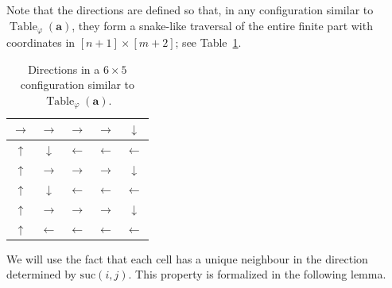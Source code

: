 \documentclass{article}
\theoremstyle{plain}
\theoremstyle{definition}
\DeclareMathOperator{\Table}{Table}
\newcommand{\tuple}{\mathbf}
\begin{document}
Note that the directions are defined so that, in any configuration similar to $\Table_\varphi(\tuple a)$, they form a snake-like traversal of the entire finite part with coordinates in
$[n+1]\times[m+2]$; see Table~\ref{tab:arrows}.

\begin{table}[h]
\centering
\begin{tabular}{|c|c|c|c|c|}
 \hline
$\to$ & $\to$ & $\to$ & $\to$ &  $\downarrow$ \\
 \hline
$\uparrow$ & $\downarrow$ & $\leftarrow$ & $\leftarrow$ & $\leftarrow$ \\
 \hline
$\uparrow$ & $\to$ & $\to$ & $\to$ & $\downarrow$ \\
 \hline
$\uparrow$ & $\downarrow$ & $\leftarrow$ & $\leftarrow$ & $\leftarrow$ \\
 \hline
$\uparrow$ &  $\to$ & $\to$ & $\to$ & $\downarrow$  \\
 \hline
$\uparrow$ &  $\leftarrow$ & $\leftarrow$ & $\leftarrow$ & $\leftarrow$ \\
 \hline
\end{tabular}
\caption{Directions in a $6\times5$ configuration similar to
$\Table_\varphi(\tuple a)$.}

\label{tab:arrows} 
\end{table}

We will use the fact that each cell has a unique neighbour in the
direction determined by $\mathrm{suc}(i,j)$.
This property is formalized in the following lemma.
\end{document}
